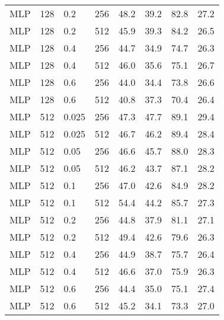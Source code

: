 \begin{table}[]
\begin{tabular}{llll rrrr}
        MLP & 128 & 0.2 & 256 & 48.2 & 39.2 & 82.8 & 27.2 \\
        MLP & 128 & 0.2 & 512 & 45.9 & 39.3 & 84.2 & 26.5 \\
        MLP & 128 & 0.4 & 256 & 44.7 & 34.9 & 74.7 & 26.3 \\
        MLP & 128 & 0.4 & 512 & 46.0 & 35.6 & 75.1 & 26.7 \\
        MLP & 128 & 0.6 & 256 & 44.0 & 34.4 & 73.8 & 26.6 \\
        MLP & 128 & 0.6 & 512 & 40.8 & 37.3 & 70.4 & 26.4 \\
        MLP & 512 & 0.025 & 256 & 47.3 & 47.7 & 89.1 & 29.4 \\
        MLP & 512 & 0.025 & 512 & 46.7 & 46.2 & 89.4 & 28.4 \\
        MLP & 512 & 0.05 & 256 & 46.6 & 45.7 & 88.0 & 28.3 \\
        MLP & 512 & 0.05 & 512 & 46.2 & 43.7 & 87.1 & 28.2 \\
        MLP & 512 & 0.1 & 256 & 47.0 & 42.6 & 84.9 & 28.2 \\
        MLP & 512 & 0.1 & 512 & 54.4 & 44.2 & 85.7 & 27.3 \\
        MLP & 512 & 0.2 & 256 & 44.8 & 37.9 & 81.1 & 27.1 \\
        MLP & 512 & 0.2 & 512 & 49.4 & 42.6 & 79.6 & 26.3 \\
        MLP & 512 & 0.4 & 256 & 44.9 & 38.7 & 75.7 & 26.4 \\
        MLP & 512 & 0.4 & 512 & 46.6 & 37.0 & 75.9 & 26.3 \\
        MLP & 512 & 0.6 & 256 & 44.4 & 35.0 & 75.1 & 27.4 \\
        MLP & 512 & 0.6 & 512 & 45.2 & 34.1 & 73.3 & 27.0 \\
        \bottomrule
    \end{tabular}
\end{table}


